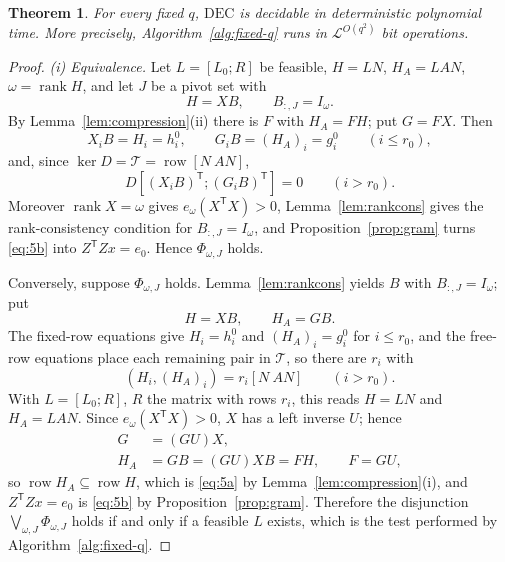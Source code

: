 \documentclass[journal]{IEEEtran}
\theoremstyle{plainn}
\newtheorem{thm}{Theorem}
\theoremstyle{remark}
\begin{document}
\begin{thm}\label{thm:fixedq}
For every fixed $q$, $\mathrm{DEC}$ is decidable in deterministic polynomial
time. More precisely, Algorithm~\ref{alg:fixed-q} runs in
$\mathcal L^{O(q^2)}$ bit operations.
\end{thm}

\begin{proof}
\emph{(i) Equivalence.} Let $L=[L_0;R]$ be feasible, $H=LN$, $H_A=LAN$,
$\omega=\operatorname{rank}H$, and let $J$ be a pivot set with
\[
H=XB,\qquad B_{:,J}=I_\omega .
\]
By Lemma~\ref{lem:compression}(ii) there is $F$ with $H_A=FH$; put $G=FX$.
Then
\[
X_iB=H_i=h_i^0,\qquad G_iB=(H_A)_i=g_i^0\qquad(i\le r_0),
\]
and, since $\ker D=\mathcal T=\operatorname{row}[N\ AN]$,
\[
D[(X_iB)^{\mathsf T};(G_iB)^{\mathsf T}]=0\qquad(i>r_0).
\]
Moreover $\operatorname{rank}X=\omega$ gives $e_\omega(X^{\mathsf T}X)>0$,
Lemma~\ref{lem:rankcons} gives the rank-consistency condition for
$B_{:,J}=I_\omega$, and Proposition~\ref{prop:gram} turns \eqref{eq:5b} into
$Z^{\mathsf T}Zx=e_0$. Hence $\Phi_{\omega,J}$ holds.

Conversely, suppose $\Phi_{\omega,J}$ holds. Lemma~\ref{lem:rankcons} yields
$B$ with $B_{:,J}=I_\omega$; put
\[
H=XB,\qquad H_A=GB .
\]
The fixed-row equations give $H_i=h_i^0$ and $(H_A)_i=g_i^0$ for $i\le r_0$,
and the free-row equations place each remaining pair in $\mathcal T$, so there
are $r_i$ with
\[
(H_i,(H_A)_i)=r_i[N\ AN]\qquad(i>r_0).
\]
With $L=[L_0;R]$, $R$ the matrix with rows $r_i$, this reads $H=LN$ and
$H_A=LAN$. Since $e_\omega(X^{\mathsf T}X)>0$, $X$ has a left inverse $U$;
hence
\[
\begin{aligned}
G&=(GU)X,\\
H_A&=GB=(GU)XB=FH,\qquad F=GU,
\end{aligned}
\]
so $\operatorname{row}H_A\subseteq\operatorname{row}H$, which is
\eqref{eq:5a} by Lemma~\ref{lem:compression}(i), and $Z^{\mathsf T}Zx=e_0$ is
\eqref{eq:5b} by Proposition~\ref{prop:gram}. Therefore the disjunction
$\bigvee_{\omega,J}\Phi_{\omega,J}$ holds if and only if a feasible $L$
exists, which is the test performed by Algorithm~\ref{alg:fixed-q}.


\end{proof}
\end{document}
